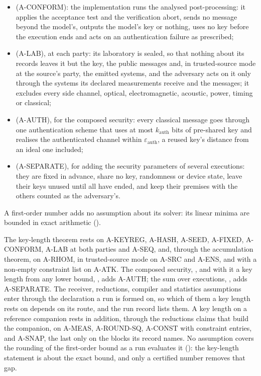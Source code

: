 \begin{enumerate}[itemsep=2pt]
\begin{itemize}[itemsep=1pt,leftmargin=1.2em]
    R\'enyi order $\alpha$ are fixed before the run and applied unchanged, which is what makes the
    protocol fixed-length;
  \item {} (A-CONFORM): the implementation runs
    the analysed post-processing: it applies the acceptance test and the
    verification abort, sends no message beyond the model's, outputs the
    model's key or nothing, uses no key before the execution ends and acts
    on an authentication failure as prescribed;
  \item {} (A-LAB), at each party: its laboratory is
    sealed, so that nothing about its records leaves it but the key, the
    public messages and, in trusted-source mode at the source's party, the
    emitted systems, and the adversary acts on it only through the systems
    its declared measurements receive and the messages; it excludes every
    side channel, optical, electromagnetic, acoustic, power, timing or
    classical;
  \item {} (A-AUTH), for the composed security: every
    classical message goes through one authentication scheme that uses at
    most $k_{\mathrm{auth}}$ bits of pre-shared key and realises the
    authenticated channel within $\varepsilon_{\mathrm{auth}}$, a reused
    key's distance from an ideal one included;
  \item {} (A-SEPARATE), for adding
    the security parameters of several executions: they are fixed in
    advance, share no key, randomness or device state, leave their keys
    unused until all have ended, and keep their premises with the others
    counted as the adversary's.
  \end{itemize}
  A first-order number adds no assumption about its solver: its linear
  minima are bounded in exact arithmetic
  ().
\end{enumerate}
The key-length theorem  rests on A-KEYREG,
A-HASH, A-SEED, A-FIXED, A-CONFORM, A-LAB at both parties and A-SEQ, and,
through the accumulation theorem, on A-RHOM, in trusted-source
mode on A-SRC and A-ENS, and with a non-empty constraint list on A-ATK. The
composed security, , and with it a key
length from any lower bound, , adds
A-AUTH; the sum over executions, ,
adds A-SEPARATE. The receiver, reductions, compiler and statistics
assumptions enter through the declaration a run is formed on, so which of
them a key length rests on depends on its route, and the run record lists
them. A key length on a reference companion rests in addition, through the
reductions claims that build the companion, on A-MEAS, A-ROUND-SQ, A-CONST
with constraint entries, and A-SNAP, the last only on the blocks its record
names. No assumption covers the rounding of the first-order bound as a run evaluates it ():
the key-length statement is about the exact bound, and only a certified
number removes that gap.


